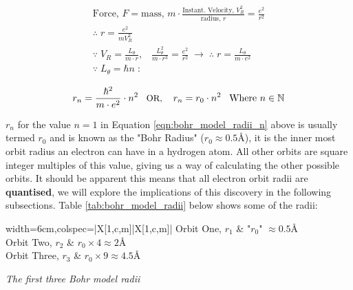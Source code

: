 \documentclass[../../Quantum-Technologies-Notes]{subfiles}
\begin{document}
			\begin{gather*}
					\text{Force, }F  =  \text{mass, }m  \cdot  \frac{\text{Instant. Velocity, }V_R^2}{\text{radius, }r}  =  \frac{e^2}{r^2} \\
					\therefore \;  r  =  \frac{e^2}{m  V_R^2} \\
					\because \; V_R  =  \frac{L_\theta}{m  \cdot  r},  \; \; \; \frac{L_\theta^2}{m \cdot r^3}  =  \frac{e^2}{r^2} \; \to \; \therefore \; r  =  \frac{L_\theta}{m \cdot e^2} \\
					\because \; L_\theta  =  \hbar n \; :
				\end{gather*}
			
			\begin{equation} \label{eqn:bohr_model_radii_n}
					 r_n  =  \frac{\hbar^2}{m \cdot e^2} \cdot n^2  \; \; \; \text{\small OR, } \; \; \; r_n  =  r_0 \cdot n^2 \; \; \; \text{Where } n \in \mathbb{N}	
				\end{equation}
			
			
			$r_n$ for the value $n=1$ in Equation \ref{eqn:bohr_model_radii_n} above is usually termed $r_0$ and is known as the "Bohr Radius" ($r_0 \approx 0.5$\r{A}), it is the inner most orbit radius an electron can have in a hydrogen atom. All other orbits are square integer multiples of this value, giving us a way of calculating the other possible orbits. It should be apparent this means that all electron orbit radii are \textbf{quantised}, we will explore the implications of this discovery in the following subsections. Table \ref{tab:bohr_model_radii} below shows some of the radii: \linebreak
			
			\begin{table}[h!]
					\color{body}
					\centering
					\begin{tblr}{width=6cm,colspec={|X[1,c,m]|X[1,c,m]|}}
							\hline
							{\small Orbit One, }$r_1$ & "$r_0$" $\approx 0.5${\small \r{A}}\\	
							\hline
							{\small Orbit Two, }$r_2$ & $r_0 \times 4 \approx 2${\small \r{A}} \\
							\hline
							{\small Orbit Three, }$r_3$ & $r_0 \times 9 \approx 4.5${\small \r{A}} \\
							\hline
						\end{tblr}
					\caption{\label{tab:bohr_model_radii}\textit{The first three Bohr model radii}}
				\end{table}
			
			\pagebreak
			
\end{document}
